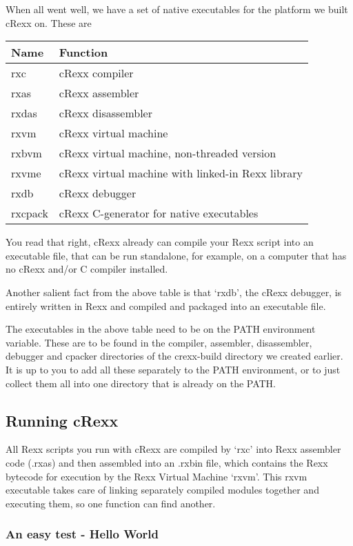 When all went well, we have a set of native executables for the platform
we built cRexx on. These are

\begin{longtable}[]{@{}ll@{}}
\toprule()
Name & Function \\
\midrule()
\endhead
rxc & cRexx compiler \\
rxas & cRexx assembler \\
rxdas & cRexx disassembler \\
rxvm & cRexx virtual machine \\
rxbvm & cRexx virtual machine, non-threaded version \\
rxvme & cRexx virtual machine with linked-in Rexx library \\
rxdb & cRexx debugger \\
rxcpack & cRexx C-generator for native executables \\
\bottomrule()
\end{longtable}

You read that right, cRexx already can compile your Rexx script into an
executable file, that can be run standalone, for example, on a computer
that has no cRexx and/or C compiler installed.

Another salient fact from the above table is that `rxdb', the cRexx
debugger, is entirely written in Rexx and compiled and packaged into an
executable file.

The executables in the above table need to be on the PATH environment
variable. These are to be found in the compiler, assembler,
disassembler, debugger and cpacker directories of the crexx-build
directory we created earlier. It is up to you to add all these
separately to the PATH environment, or to just collect them all into one
directory that is already on the PATH.

\hypertarget{running-crexx}{%
\subsection{Running cRexx}\label{running-crexx}}

All Rexx scripts you run with cRexx are compiled by `rxc' into Rexx
assembler code (.rxas) and then assembled into an .rxbin file, which
contains the Rexx bytecode for execution by the Rexx Virtual Machine
`rxvm'. This rxvm executable takes care of linking separately compiled
modules together and executing them, so one function can find another.

\hypertarget{an-easy-test---hello-world}{%
\subsubsection{An easy test - Hello
World}\label{an-easy-test---hello-world}}


